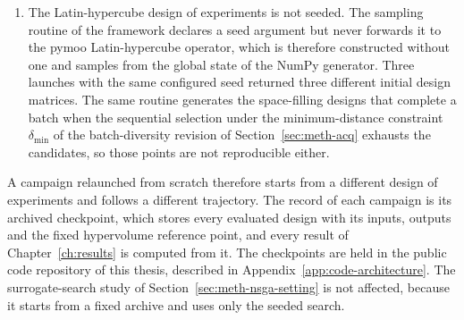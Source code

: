 \begin{itemize}
\begin{enumerate}
          \item The Latin-hypercube design of experiments is not
                seeded. The sampling routine of the framework declares a
                seed argument but never forwards it to the pymoo
                Latin-hypercube operator, which is therefore constructed
                without one and samples from the global state of the
                NumPy generator. Three launches with the same configured
                seed returned three different initial design matrices.
                The same routine generates the space-filling designs
                that complete a batch when the sequential selection
                under the minimum-distance constraint
                $\delta_\mathrm{min}$ of the batch-diversity revision
                of Section~\ref{sec:meth-acq} exhausts the candidates,
                so those points are not reproducible either.
        \end{enumerate}

        A campaign relaunched from scratch therefore starts from a
        different design of experiments and follows a different
        trajectory. The record of each campaign is its archived
        checkpoint, which stores every evaluated design with its inputs,
        outputs and the fixed hypervolume reference point, and every
        result of Chapter~\ref{ch:results} is computed from it. The
        checkpoints are held in the public code repository of this
        thesis, described in
        Appendix~\ref{app:code-architecture}. The
        surrogate-search study of Section~\ref{sec:meth-nsga-setting} is
        not affected, because it starts from a fixed archive and uses
        only the seeded search.
\end{itemize}


\label{sec:meth-cost}

\label{sec:meth-dep-level}\label{eq:t-solve}\label{eq:t-solve-fit}\label{eq:t-step}\label{eq:bateman-asm}\label{eq:t-step-core}\label{tab:dep-level-cost}\label{tab:dep-3d-cost}

